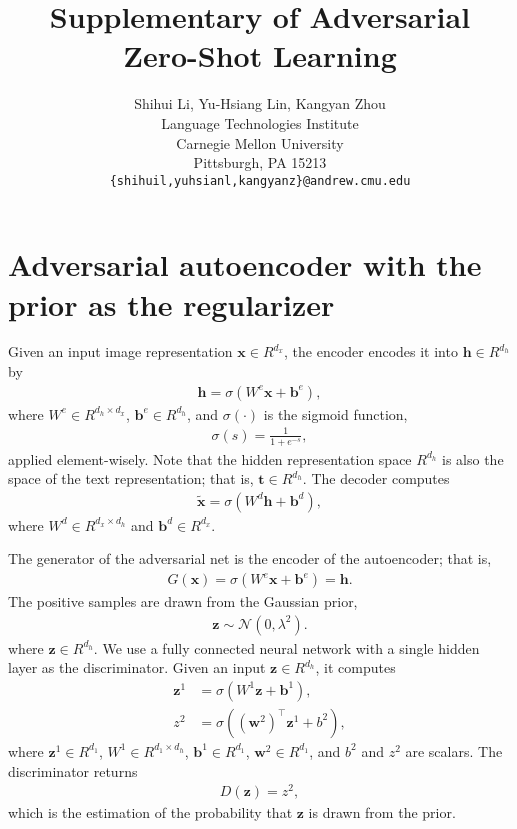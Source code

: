 \documentclass{article}
\title{Supplementary of Adversarial Zero-Shot Learning}
\author{
	Shihui Li, Yu-Hsiang Lin, Kangyan Zhou
		\\
	Language Technologies Institute\\
	Carnegie Mellon University\\
	Pittsburgh, PA 15213 \\
	\texttt{\{shihuil,yuhsianl,kangyanz\}@andrew.cmu.edu} \\
}
\newcommand{\bb}[1]{\boldsymbol{#1}}
\begin{document}

\maketitle







\section{Adversarial autoencoder with the prior as the regularizer}

	Given an input image representation $\bb{x} \in R^{d_x}$, the encoder encodes it into $\bb{h} \in R^{d_h}$ by
	\begin{align}
		\bb{h} = \sigma(W^e \bb{x} + \bb{b}^e),
	\end{align}
	where $W^e \in R^{d_h \times d_x}$, $\bb{b}^e \in R^{d_h}$, and $\sigma(\cdot)$ is the sigmoid function,
	\begin{align}
		\sigma(s) = \frac{1}{1 + e^{-s}},
	\end{align}
	applied element-wisely. Note that the hidden representation space $R^{d_h}$ is also the space of the text representation; that is, $\bb{t} \in R^{d_h}$. The decoder computes
	\begin{align}
		\tilde{\bb{x}} = \sigma(W^d \bb{h} + \bb{b}^d),
	\end{align}
	where $W^d \in R^{d_x \times d_h}$ and $\bb{b}^d \in R^{d_x}$.
	
	The generator of the adversarial net is the encoder of the autoencoder; that is,
	\begin{align}
		G(\bb{x}) = \sigma(W^e \bb{x} + \bb{b}^e) = \bb{h}.
	\end{align}
	The positive samples are drawn from the Gaussian prior,
	\begin{align}
		\bb{z} \sim \mathcal{N}(0, \lambda^2).
	\end{align}
	where $\bb{z} \in R^{d_h}$.	We use a fully connected neural network with a single hidden layer as the discriminator. Given an input $\bb{z} \in R^{d_h}$, it computes
	\begin{align}
		\bb{z}^1 &= \sigma( W^1 \bb{z} + \bb{b}^1 ), \\
		z^2 &= \sigma( (\bb{w}^2)^{\top} \bb{z}^1 + b^2 ),
	\end{align}
	where $\bb{z}^1 \in R^{d_1}$, $W^1 \in R^{d_1 \times d_h}$, $\bb{b}^1 \in R^{d_1}$, $\bb{w}^2 \in R^{d_1}$, and $b^2$ and $z^2$ are scalars. The discriminator returns
	\begin{align}
		D(\bb{z}) = z^2,
	\end{align}
	which is the estimation of the probability that $\bb{z}$ is drawn from the prior.
	
\end{document}
